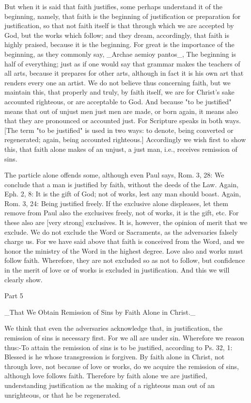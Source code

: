 But when it is said that faith justifies, some perhaps understand it
of the beginning, namely, that faith is the beginning of
justification or preparation for justification, so that not faith
itself is that through which we are accepted by God, but the works
which follow; and they dream, accordingly, that faith is highly
praised, because it is the beginning.  For great is the importance of
the beginning, as they commonly say, _Archae aemioy pantos_, The
beginning is half of everything; just as if one would say that
grammar makes the teachers of all arts, because it prepares for other
arts, although in fact it is his own art that renders every one an
artist.  We do not believe thus concerning faith, but we maintain
this, that properly and truly, by faith itself, we are for Christ's
sake accounted righteous, or are acceptable to God.  And because "to
be justified" means that out of unjust men just men are made, or born
again, it means also that they are pronounced or accounted just.  For
Scripture speaks in both ways.  [The term "to be justified" is used
in two ways: to denote, being converted or regenerated; again, being
accounted righteous.] Accordingly we wish first to show this, that
faith alone makes of an unjust, a just man, i.e., receives remission
of sins.

The particle alone offends some, although even Paul says, Rom. 3, 28:
We conclude that a man is justified by faith, without the deeds of
the Law.  Again, Eph. 2, 8: It is the gift of God; not of works, lest
any man should boast.  Again, Rom. 3, 24: Being justified freely.  If
the exclusive alone displeases, let them remove from Paul also the
exclusives freely, not of works, it is the gift, etc. For these also
are [very strong] exclusives.  It is, however, the opinion of merit
that we exclude.  We do not exclude the Word or Sacraments, as the
adversaries falsely charge us.  For we have said above that faith is
conceived from the Word, and we honor the ministry of the Word in the
highest degree.  Love also and works must follow faith.  Wherefore,
they are not excluded so as not to follow, but confidence in the
merit of love or of works is excluded in justification.  And this we
will clearly show.




Part 5


_That We Obtain Remission of Sins by Faith Alone in Christ._

We think that even the adversaries acknowledge that, in justification,
the remission of sins is necessary first.  For we all are under sin.
Wherefore we reason thus:-To attain the remission of sins is to be
justified, according to Ps. 32, 1: Blessed is he whose transgression
is forgiven.  By faith alone in Christ, not through love, not because
of love or works, do we acquire the remission of sins, although love
follows faith.  Therefore by faith alone we are justified,
understanding justification as the making of a righteous man out of
an unrighteous, or that he be regenerated.

